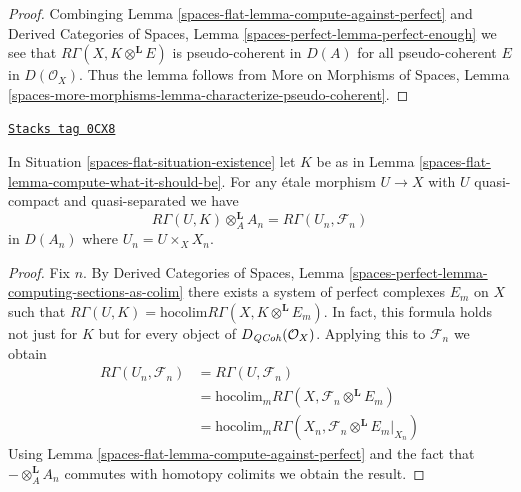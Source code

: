 \begin{proof}
Combinging Lemma \ref{spaces-flat-lemma-compute-against-perfect} and
Derived Categories of Spaces, Lemma \ref{spaces-perfect-lemma-perfect-enough}
we see that $R\Gamma(X, K \otimes^\mathbf{L} E)$
is pseudo-coherent in $D(A)$ for all pseudo-coherent
$E$ in $D(\mathcal{O}_X)$. Thus the lemma follows from
More on Morphisms of Spaces, Lemma
\ref{spaces-more-morphisms-lemma-characterize-pseudo-coherent}.
\end{proof}

\begin{lemma}
\label{spaces-flat-lemma-compute-over-affine}
\href{https://stacks.math.columbia.edu/tag/0CX8}{\texttt{Stacks tag 0CX8}}

In Situation \ref{spaces-flat-situation-existence} let $K$ be as in
Lemma \ref{spaces-flat-lemma-compute-what-it-should-be}. For any
\'etale morphism $U \to X$ with $U$ quasi-compact and quasi-separated we have
$$
R\Gamma(U, K) \otimes_A^\mathbf{L} A_n =
R\Gamma(U_n, \mathcal{F}_n)
$$
in $D(A_n)$ where $U_n = U \times_X X_n$.
\end{lemma}

\begin{proof}
Fix $n$. By Derived Categories of Spaces, Lemma
\ref{spaces-perfect-lemma-computing-sections-as-colim}
there exists a system of perfect complexes $E_m$
on $X$ such that
$R\Gamma(U, K) = \text{hocolim} R\Gamma(X, K \otimes^\mathbf{L} E_m)$.
In fact, this formula holds not just for $K$ but for every object of
$D_{\mathit{QCoh}}(\mathcal{O}_X)$.
Applying this to $\mathcal{F}_n$
we obtain
\begin{align*}
R\Gamma(U_n, \mathcal{F}_n)
& =
R\Gamma(U, \mathcal{F}_n) \\
& =
\text{hocolim}_m R\Gamma(X, \mathcal{F}_n \otimes^\mathbf{L} E_m) \\
& =
\text{hocolim}_m R\Gamma(X_n, \mathcal{F}_n \otimes^\mathbf{L} E_m|_{X_n})
\end{align*}
Using Lemma \ref{spaces-flat-lemma-compute-against-perfect}
and the fact that $- \otimes_A^\mathbf{L} A_n$
commutes with homotopy colimits we obtain the result.
\end{proof}

